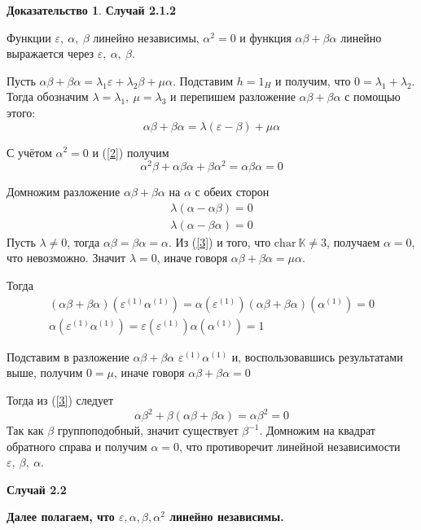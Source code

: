 \documentclass[a4paper, 12pt]{article}
\theoremstyle{definition}
\newtheorem*{prof}{\hspace*{\parindent}Доказательство}
\begin{document}
\begin{prof}
    \textbf{Случай 2.1.2}

    Функции $\varepsilon,\ \alpha,\ \beta$ линейно независимы, $\alpha^2 =0$ и функция $\alpha\beta+\beta\alpha$ линейно выражается через $\varepsilon,\ \alpha,\ \beta$.

    Пусть $\alpha\beta + \beta\alpha = \lambda_1\varepsilon+\lambda_2\beta + \mu\alpha$. Подставим $h = 1_H$ и получим, что $0 = \lambda_1 + \lambda_2$. Тогда обозначим $\lambda = \lambda_1,\ \mu = \lambda_3$ и перепишем разложение $\alpha\beta+\beta\alpha$ с помощью этого: \[
    \alpha\beta+\beta\alpha = \lambda(\varepsilon-\beta) + \mu\alpha
    \]
    
    С учётом $\alpha^2=0$ и (\ref{2}) получим \[
    \alpha^2\beta+\alpha\beta\alpha+\beta\alpha^2 = \alpha\beta\alpha = 0
    \]

    Домножим разложение $\alpha\beta+\beta\alpha$ на $\alpha$ с обеих сторон 
    \begin{eqnarray*}
        \lambda(\alpha-\alpha\beta) = 0\\
        \lambda(\alpha-\beta\alpha) = 0
    \end{eqnarray*}
    Пусть $\lambda \neq 0$, тогда $\alpha\beta=\beta\alpha = \alpha$. Из (\ref{3}) и того, что $\mathrm{char}\ \mathbb{K} \neq 3$, получаем $\alpha = 0$, что невозможно.
    Значит $\lambda = 0$, иначе говоря $\alpha\beta+\beta\alpha = \mu\alpha$.

    Тогда 
    \begin{eqnarray*}
    (\alpha\beta+\beta\alpha)(\varepsilon^{(1)}\alpha^{(1)}) = \alpha(\varepsilon^{(1)})(\alpha\beta+\beta\alpha)(\alpha^{(1)}) = 0\\
    \alpha(\varepsilon^{(1)}\alpha^{(1)}) = \varepsilon(\varepsilon^{(1)})\alpha(\alpha^{(1)}) = 1
    \end{eqnarray*}

    Подставим в разложение $\alpha\beta+\beta\alpha$ $\varepsilon^{(1)}\alpha^{(1)}$ и, воспользовавшись результатами выше, получим $0 = \mu$, иначе говоря $\alpha\beta+\beta\alpha = 0$

    Тогда из (\ref{3}) следует \[
    \alpha\beta^2+\beta(\alpha\beta+\beta\alpha) = \alpha\beta^2=0
    \]
    Так как $\beta$ группоподобный, значит существует $\beta^{-1}$. Домножим на квадрат обратного справа и получим  $\alpha = 0$, что противоречит линейной независимости $\varepsilon,\ \beta,\ \alpha$.
    
    \textbf{Случай 2.2}

    \textbf{Далее полагаем, что $\varepsilon, \alpha, \beta, \alpha^2$ линейно независимы.}


\end{prof}
\end{document}
